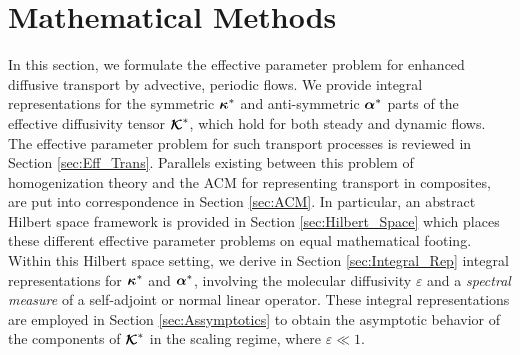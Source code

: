 \documentclass[11pt]{amsart}
\newcommand\Kbc{\mbox{\boldmath${\mathcal{K}}$}}
\newcommand\balpha{\mbox{\boldmath${\alpha}$}}
\newcommand\bkappa{\mbox{\boldmath${\kappa}$}}
\begin{document}
\section{Mathematical Methods}\label{sec:Mathematical_Methods} 
%
In this section, we formulate the effective parameter problem for
enhanced diffusive transport by advective, periodic flows. We provide
integral representations for the symmetric $\bkappa^*$ and
anti-symmetric $\balpha^*$ parts of the effective diffusivity tensor 
$\Kbc^*$, which hold for both steady and dynamic flows. The effective
parameter problem \cite{Fannjiang:SIAM_JAM:333} for such transport
processes  is reviewed in Section \ref{sec:Eff_Trans}. Parallels
existing between this problem of homogenization theory
\cite{Bensoussan:Book:1978} and the ACM for representing transport in
composites, are put into correspondence in Section \ref{sec:ACM}. In
particular, an abstract Hilbert space framework is provided in Section
\ref{sec:Hilbert_Space} which places these different effective
parameter problems on equal mathematical footing. Within this Hilbert
space setting, we derive in Section \ref{sec:Integral_Rep} integral
representations for $\bkappa^*$ and $\balpha^*$, involving the
molecular diffusivity $\varepsilon$ and a \emph{spectral measure} of a
self-adjoint or normal linear operator. These integral representations
are employed in Section \ref{sec:Assymptotics} to obtain the asymptotic
behavior of the components of $\Kbc^*$ in the scaling regime, where
$\varepsilon\ll1$.  
\end{document}
